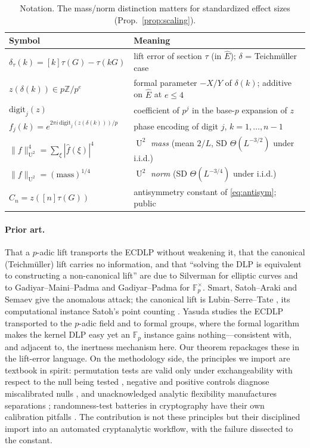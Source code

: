 \documentclass[11pt]{article}
\theoremstyle{definition}
\newcommand{\Fp}{\mathbb{F}_p}
\newcommand{\Z}{\mathbb{Z}}
\newcommand{\Ehat}{\widehat{E}}
\DeclareMathOperator{\Uk}{U}
\begin{document}
\begin{table}[h]
\centering\small
\begin{tabular}{ll}
\toprule
Symbol & Meaning\\
\midrule
$\delta_\tau(k)=[k]\tau(G)-\tau(kG)$ & lift error of section $\tau$ (in $\Ehat$); $\delta$ = Teichm\"uller case\\
$z(\delta(k))\in p\Z/p^e$ & formal parameter $-X/Y$ of $\delta(k)$; additive on $\Ehat$ at $e\le4$\\
$\mathrm{digit}_j(z)$ & coefficient of $p^j$ in the base-$p$ expansion of $z$\\
$f_j(k)=e^{2\pi i\,\mathrm{digit}_j(z(\delta(k)))/p}$ & phase encoding of digit $j$, $k=1,\dots,n-1$\\
$\|f\|_{\Uk^2}^4=\sum_\xi|\hat f(\xi)|^4$ & $\Uk^2$ \emph{mass} (mean $2/L$, SD $\Theta(L^{-3/2})$ under i.i.d.)\\
$\|f\|_{\Uk^2}=(\text{mass})^{1/4}$ & $\Uk^2$ \emph{norm} (SD $\Theta(L^{-3/4})$ under i.i.d.)\\
$C_n=z([n]\tau(G))$ & antisymmetry constant of \eqref{eq:antisym}; public\\
\bottomrule
\end{tabular}
\caption{Notation. The mass/norm distinction matters for standardized
effect sizes (Prop.~\ref{prop:scaling}).}
\label{tab:notation}
\end{table}

\paragraph{Prior art.} That a $p$-adic lift transports the ECDLP without
weakening it, that the canonical (Teichm\"uller) lift carries no
information, and that ``solving the DLP is equivalent to constructing a
non-canonical lift'' are due to Silverman \cite{silvermanlift,
silverman4faces} for elliptic curves and to Gadiyar--Maini--Padma and
Gadiyar--Padma \cite{gadiyarpadma} for $\Fp^\times$. Smart, Satoh--Araki
and Semaev \cite{smart,satoharaki,semaev} give the anomalous attack; the
canonical lift is Lubin--Serre--Tate \cite{lst}, its computational
instance Satoh's point counting \cite{satohcount}. Yasuda \cite{yasuda}
studies the ECDLP transported to the $p$-adic field and to formal groups,
where the formal logarithm makes the kernel DLP easy yet an $\Fp$
instance gains nothing---consistent with, and adjacent to, the inertness
mechanism here. Our theorem repackages these in the lift-error language.
On the methodology side, the principles we import are textbook in spirit:
permutation tests are valid only under exchangeability with respect to
the null being tested \cite{good}, negative and positive controls
diagnose miscalibrated nulls \cite{lipsitch}, and unacknowledged analytic
flexibility manufactures separations
\cite{gelmanloken,simonsohn,steegen}; randomness-test batteries in
cryptography have their own calibration pitfalls \cite{nistsp}. The
contribution is not these principles but their disciplined import into an
automated cryptanalytic workflow, with the failure dissected to the
constant.
\end{document}
